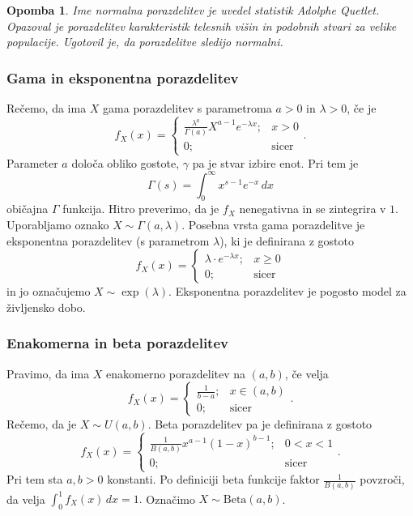 \documentclass[10pt, a4paper]{article}
\newtheorem*{opomba}{Opomba}
\begin{document}
\begin{opomba}
  Ime normalna porazdelitev je uvedel statistik Adolphe Quetlet.
  Opazoval je porazdelitev karakteristik telesnih višin in podobnih 
  stvari za velike populacije. Ugotovil je, da porazdelitve sledijo normalni.
\end{opomba}

\subsubsection*{Gama in eksponentna porazdelitev}

Rečemo, da ima $X$ gama porazdelitev s parametroma $a > 0$ in $\lambda > 0$,
če je 
$$f_X (x) = \begin{cases}
  \frac{\lambda^a}{\Gamma(a)} X^{a - 1} e^{-\lambda x}; & x > 0\\
  0; & \text{sicer}
\end{cases}.$$
Parameter $a$ določa obliko gostote, $\gamma$
pa je stvar izbire enot.
Pri tem je 
$$\Gamma(s) = \int_0^\infty x^{s - 1} e^{-x}\, dx$$
običajna $\Gamma$ funkcija. Hitro preverimo,
da je $f_X$ nenegativna in se zintegrira v $1$.
Uporabljamo oznako $X \sim \Gamma(a, \lambda)$.
Posebna vrsta gama porazdelitve je eksponentna porazdelitev (s parametrom $\lambda$), ki je definirana z gostoto 
$$f_X (x) = \begin{cases}
  \lambda \cdot e^{- \lambda x};& x \geq 0\\
  0;& \mathrm{sicer}
\end{cases}$$
in jo označujemo $X \sim \exp (\lambda)$. Eksponentna porazdelitev je pogosto 
model za življensko dobo.

\subsubsection*{Enakomerna in beta porazdelitev}

Pravimo, da ima $X$ enakomerno porazdelitev na $(a, b)$, če velja 
$$f_X (x) = \begin{cases}
  \frac{1}{b - a}; & x \in (a, b)\\
  0; &\text{sicer}
\end{cases}.$$
Rečemo, da je $X \sim U(a, b)$. Beta porazdelitev 
pa je definirana z gostoto 
$$f_X (x) = \begin{cases}
  \frac{1}{B(a, b)} x^{a - 1} (1 - x)^{b - 1}; & 0 < x < 1\\
  0;& \text{sicer}
\end{cases}.$$
Pri tem sta $a, b > 0$ konstanti. Po definiciji beta funkcije faktor $\frac{1}{B(a, b)}$ povzroči, da velja 
$\int_0 ^1 f_X (x)\, dx = 1.$ Označimo $X \sim \textrm{Beta}(a, b)$.
\end{document}
